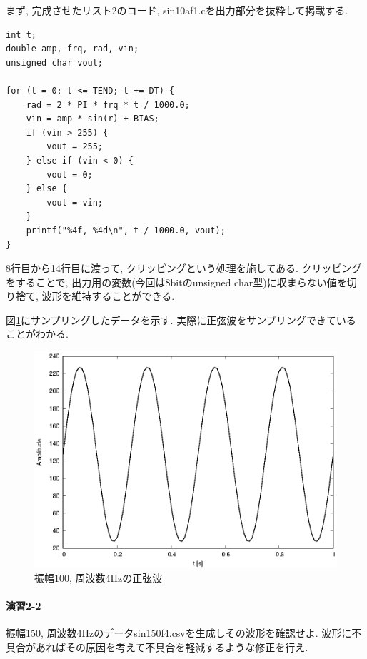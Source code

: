\documentclass[titlepage]{jsarticle}
\begin{document}
        まず, 完成させたリスト2のコード, sin10af1.cを出力部分を抜粋して掲載する.

        \begin{lstlisting}[caption=sin10af1.c, label=src:sin10af1]
int t;
double amp, frq, rad, vin;
unsigned char vout;

for (t = 0; t <= TEND; t += DT) {
    rad = 2 * PI * frq * t / 1000.0;
    vin = amp * sin(r) + BIAS;
    if (vin > 255) {
        vout = 255;
    } else if (vin < 0) {
        vout = 0;
    } else {
        vout = vin;
    }
    printf("%4f, %4d\n", t / 1000.0, vout);
}\end{lstlisting}

        8行目から14行目に渡って, クリッピングという処理を施してある.
        クリッピングをすることで, 出力用の変数(今回は8bitのunsigned char型)に収まらない値を切り捨て,
        波形を維持することができる.

        図\ref{fig:sin100f4}にサンプリングしたデータを示す.
        実際に正弦波をサンプリングできていることがわかる.

        \begin{figure}[ht]
            \centering
            \includegraphics[width=12cm]{images/sin100f4.eps}
            \caption{振幅100, 周波数4Hzの正弦波}
            \label{fig:sin100f4}
        \end{figure}

    \paragraph{演習2-2} 振幅150, 周波数4Hzのデータsin150f4.csvを生成しその波形を確認せよ.
    波形に不具合があればその原因を考えて不具合を軽減するような修正を行え.
        
\end{document}
